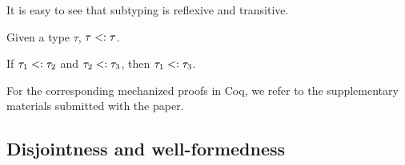 


It is easy to see that subtyping is reflexive and transitive.

\begin{lemma} \label{sub-refl}
Given a type $ \tau $, $ \tau <: \tau $.
\end{lemma}

\begin{lemma} \label{sub-trans}
If $ \tau_1 <: \tau_2 $ and $ \tau_2 <: \tau_3 $,
then $ \tau_1 <: \tau_3 $.
\end{lemma}

For the corresponding mechanized proofs in Coq, we refer to the supplementary
materials submitted with the paper.

\subsection{Disjointness and well-formedness}

